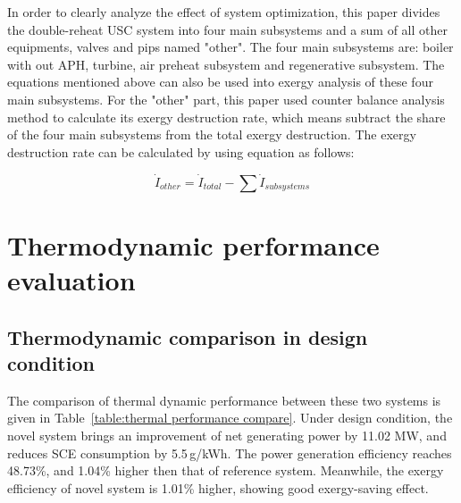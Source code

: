 \documentclass[preprint,12pt]{elsarticle}
\begin{document}
In order to clearly analyze the effect of system optimization, this paper divides the double-reheat USC system into four main subsystems and a sum of all other equipments, valves and pips named "other".
The four main subsystems are: boiler with out APH, turbine, air preheat subsystem and regenerative subsystem.
The equations mentioned above can also be used into exergy analysis of these four main subsystems.
For the "other" part, this paper used counter balance analysis method to calculate its exergy destruction rate, which means subtract the share of the four main subsystems from the total exergy destruction.
The exergy destruction rate can be calculated by using equation as follows:

\begin{equation}
\dot{I}_{other}=\dot{I}{}_{total}-\sum\dot{I}{}_{subsystems}
\end{equation}


\section{Thermodynamic performance evaluation} %
\label{sub:Thermodynamic_evaluation}
\subsection{Thermodynamic comparison in design condition}
\label{ssub:desing_compare}
The comparison of thermal dynamic performance between these two systems is given in Table~\ref{table:thermal performance compare}. 
Under design condition, the novel system brings an improvement of net generating power by 11.02 MW, and reduces SCE consumption by 5.5\,g/kWh.
The power generation efficiency reaches 48.73\%, and 1.04\% higher then that of reference system.
Meanwhile, the exergy efficiency of novel system is 1.01\% higher, showing good exergy-saving effect. 
\end{document}
